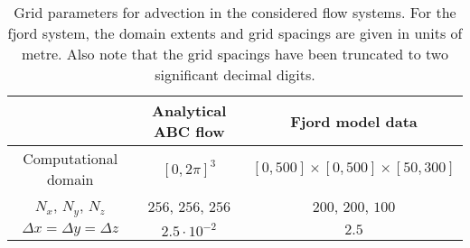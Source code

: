 \begin{table}[htpb]
    \centering
    \caption[Grid parameters for advection in the considered flow systems]
    {Grid parameters for advection in the considered flow systems. For the
        fjord system, the domain extents and grid spacings are given in
    units of metre. Also note that the grid spacings have been truncated
to two significant decimal digits.}
    \label{tab:gridparams}
    \begin{tabular}{ccc}
        \toprule
        & Analytical ABC flow & Fjord model data\\
        \midrule
        Computational domain & $[0,2\pi]^{3}$ & $[0,500]\times[0,500]\times[50,300]$\\
        $N_{x}$, $N_{y}$, $N_{z}$ & $256$, $256$, $256$ & $200$, $200$, $100$\\
        $\Delta{x} = \Delta{y} = \Delta{z}$ & $2.5\cdot10^{-2}$ & $2.5$\\
        \bottomrule
    \end{tabular}
\end{table}
